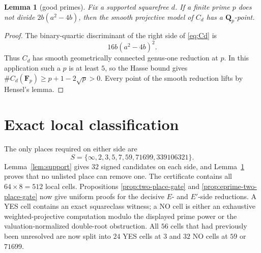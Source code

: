 \documentclass[11pt]{article}
\newtheorem{lemma}[theorem]{Lemma}
\newcommand{\Q}{\mathbf Q}
\newcommand{\F}{\mathbf F}
\begin{document}
\begin{lemma}[good primes]\label{lem:good}
Fix a supported squarefree $d$.  If a finite prime $p$ does not divide
$2b(a^2-4b)$, then the smooth projective model of $C_d$ has a $\Q_p$-point.
\end{lemma}
\begin{proof}
The binary-quartic discriminant of the right side of \eqref{eq:Cd} is
\[
 16b(a^2-4b)^2.
\]
Thus $C_d$ has smooth geometrically connected genus-one reduction at $p$.
In this application such a $p$ is at least $5$, so the Hasse bound gives
\(
 \#C_d(\F_p)\ge p+1-2\sqrt p>0.
\)
Every point of the smooth reduction lifts by Hensel's lemma.
\end{proof}

\section{Exact local classification}
The only places required on either side are
\[
 S=\{\infty,2,3,5,7,59,71699,339106321\}.
\]
Lemma~\ref{lem:support} gives $32$ signed candidates on each side, and
Lemma~\ref{lem:good} proves that no unlisted place can remove one.  The
certificate contains all $64\times8=512$ local cells.  Propositions
\ref{prop:two-place-gate} and \ref{prop:eprime-two-place-gate} now give
uniform proofs for the decisive $E$- and $E'$-side reductions.  A YES cell contains
an exact squareclass witness; a NO cell is either an exhaustive
weighted-projective computation modulo the displayed prime power or the
valuation-normalized double-root obstruction.  All $56$ cells that had
previously been unresolved are now split into $24$ YES cells at $3$ and
$32$ NO cells at $59$ or $71699$.
\end{document}
